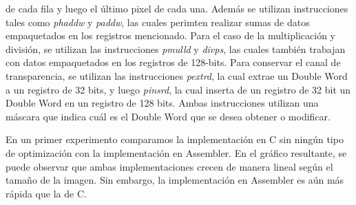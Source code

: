 \documentclass[a4paper]{article}
\begin{document}
de cada fila y luego el último pixel de cada una. Además se utilizan instrucciones tales como \textit{phaddw} y \textit{paddw}, las cuales
perimten realizar sumas de datos empaquetados en los registros mencionado. Para el caso de la multiplicación y división, se utilizan las instrucciones
\textit{pmulld} y \textit{divps}, las cuales también trabajan con datos empaquetados en los registros de 128-bits. Para conservar el canal de
transparencia, se utilizan las instrucciones \textit{pextrd}, la cual extrae un Double Word a un registro de 32 bits, y luego \textit{pinsrd},
la cual inserta de un registro de 32 bit un Double Word en un registro de 128 bits. Ambas instrucciones utilizan una máscara que indica cuál
es el Double Word que se desea obtener o modificar.
\newline

En un primer experimento comparamos la implementación en C sin ningún tipo de optimización con la implementación en Assembler. En el gráfico
resultante, se puede observar que ambas implementaciones crecen de manera lineal según el tamaño de la imagen. Sin embargo, la implementación en
Assembler es aún más rápida que la de C.

\noindent%
\begin{minipage}{\linewidth}%
\end{minipage}
\ \
\end{document}
